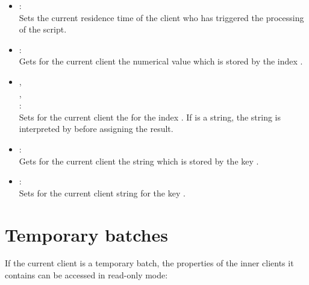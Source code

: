\begin{itemize}
\item
{}:\\
Sets the current residence time of the client who has triggered the processing of the script.
  
\item
{}:\\
Gets for the current client the numerical value which is stored by the index .
  
\item
{},\\
,\\
:\\
Sets for the current client the  for the index .
If  is a string, the string is interpreted by
 before assigning the result.
  
\item
{}:\\
Gets for the current client the string which is stored by the key .
  
\item
{}:\\
Sets for the current client string  for the key .
	
\end{itemize}

\section{Temporary batches}

If the current client is a temporary batch, the properties of the inner clients
it contains can be accessed in read-only mode:

